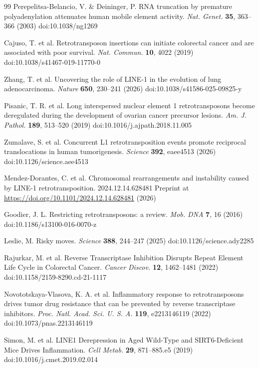 \documentclass[11pt,twocolumn,twoside]{extarticle}
\begin{document}
\begin{thebibliography}{99}
 Perepelitsa-Belancio, V. \& Deininger, P. RNA truncation by premature polyadenylation attenuates human mobile element activity. \textit{Nat. Genet.} \textbf{35}, 363--366 (2003) doi:10.1038/ng1269

 Cajuso, T. et al. Retrotransposon insertions can initiate colorectal cancer and are associated with poor survival. \textit{Nat. Commun.} \textbf{10}, 4022 (2019) doi:10.1038/s41467-019-11770-0

 Zhang, T. et al. Uncovering the role of LINE-1 in the evolution of lung adenocarcinoma. \textit{Nature} \textbf{650}, 230--241 (2026) doi:10.1038/s41586-025-09825-y

 Pisanic, T. R. et al. Long interspersed nuclear element 1 retrotransposons become deregulated during the development of ovarian cancer precursor lesions. \textit{Am. J. Pathol.} \textbf{189}, 513--520 (2019) doi:10.1016/j.ajpath.2018.11.005

 Zumalave, S. et al. Concurrent L1 retrotransposition events promote reciprocal translocations in human tumorigenesis. \textit{Science} \textbf{392}, eaee4513 (2026) doi:10.1126/science.aee4513

 Mendez-Dorantes, C. et al. Chromosomal rearrangements and instability caused by LINE-1 retrotransposition. 2024.12.14.628481 Preprint at \url{https://doi.org/10.1101/2024.12.14.628481} (2026)

 Goodier, J. L. Restricting retrotransposons: a review. \textit{Mob. DNA} \textbf{7}, 16 (2016) doi:10.1186/s13100-016-0070-z

 Leslie, M. Risky moves. \textit{Science} \textbf{388}, 244--247 (2025) doi:10.1126/science.ady2285

 Rajurkar, M. et al. Reverse Transcriptase Inhibition Disrupts Repeat Element Life Cycle in Colorectal Cancer. \textit{Cancer Discov.} \textbf{12}, 1462--1481 (2022) doi:10.1158/2159-8290.cd-21-1117

 Novototskaya-Vlasova, K. A. et al. Inflammatory response to retrotransposons drives tumor drug resistance that can be prevented by reverse transcriptase inhibitors. \textit{Proc. Natl. Acad. Sci. U. S. A.} \textbf{119}, e2213146119 (2022) doi:10.1073/pnas.2213146119

 Simon, M. et al. LINE1 Derepression in Aged Wild-Type and SIRT6-Deficient Mice Drives Inflammation. \textit{Cell Metab.} \textbf{29}, 871--885.e5 (2019) doi:10.1016/j.cmet.2019.02.014


\end{thebibliography}
\end{document}
